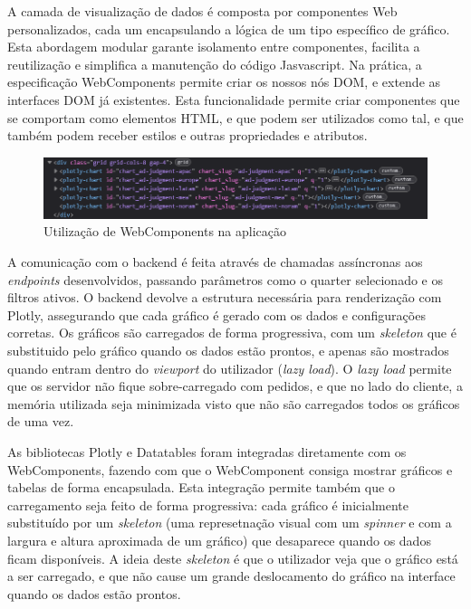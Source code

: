 A camada de visualização de dados é composta por componentes Web personalizados, cada um encapsulando a lógica de um tipo específico de gráfico. Esta abordagem modular garante isolamento entre componentes, facilita a reutilização e simplifica a manutenção do código Jasvascript. Na prática, a especificação WebComponents permite criar os nossos nós DOM, e extende as interfaces DOM já existentes. Esta funcionalidade permite criar componentes que se comportam como elementos HTML, e que podem ser utilizados como tal, e que também podem receber estilos e outras propriedades e atributos. 

\begin{figure}[H]
    \centering
    \includegraphics[width=\textwidth]{./img/webc}
 \caption{Utilização de WebComponents na aplicação}
 \end{figure}

A comunicação com o backend é feita através de chamadas assíncronas aos \textit{endpoints} desenvolvidos, passando parâmetros como o quarter selecionado e os filtros ativos. O backend devolve a estrutura necessária para renderização com Plotly, assegurando que cada gráfico é gerado com os dados e configurações corretas. Os gráficos são carregados de forma progressiva, com um \textit{skeleton} que é substituido pelo gráfico quando os dados estão prontos, e apenas são mostrados quando entram dentro do \textit{viewport} do utilizador (\textit{lazy load}). O \textit{lazy load} permite que os servidor não fique sobre-carregado com pedidos, e que no lado do cliente, a memória utilizada seja minimizada visto que não são carregados todos os gráficos de uma vez.	

As bibliotecas Plotly e Datatables foram integradas diretamente com os WebComponents, fazendo com que o WebComponent consiga mostrar gráficos e tabelas de forma encapsulada. Esta integração permite também que o carregamento seja feito de forma progressiva: cada gráfico é inicialmente substituído por um \textit{skeleton} (uma represetnação visual com um \textit{spinner} e com a largura e altura aproximada de um gráfico) que desaparece quando os dados ficam disponíveis. A ideia deste \textit{skeleton} é que o utilizador veja que o gráfico está a ser carregado, e que não cause um grande deslocamento do gráfico na interface quando os dados estão prontos.

